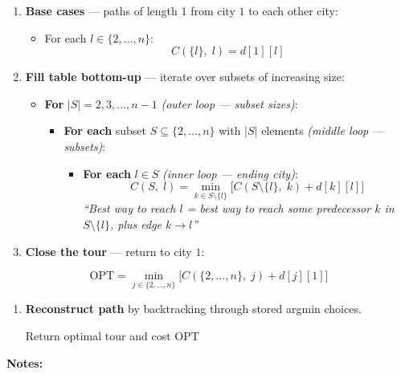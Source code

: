 \documentclass[11pt]{article}
\providecommand{\tightlist}{%
      \setlength{\itemsep}{0pt}\setlength{\parskip}{0pt}}
\begin{document}
\begin{enumerate}
\def\labelenumi{\arabic{enumi}.}
\item
  \textbf{Base cases} --- paths of length 1 from city \(1\) to each
  other city:

  \begin{itemize}
  \tightlist
  \item
    For each \(l \in \{2, \ldots, n\}\): \[C(\{l\},\; l) = d[1][l]\]
  \end{itemize}
\item
  \textbf{Fill table bottom-up} --- iterate over subsets of increasing
  size:

  \begin{itemize}
  \tightlist
  \item
    \textbf{For} \(|S| = 2, 3, \ldots, n{-}1\) \emph{(outer loop ---
    subset sizes)}:

    \begin{itemize}
    \tightlist
    \item
      \textbf{For each} subset \(S \subseteq \{2, \ldots, n\}\) with
      \(|S|\) elements \emph{(middle loop --- subsets)}:

      \begin{itemize}
      \tightlist
      \item
        \textbf{For each} \(l \in S\) \emph{(inner loop --- ending
        city)}:
        \[C(S,\; l) = \min_{k \in S \setminus \{l\}} \bigl[C(S \setminus \{l\},\; k) + d[k][l]\bigr]\]
        \emph{``Best way to reach \(l\) = best way to reach some
        predecessor \(k\) in \(S \setminus \{l\}\), plus edge
        \(k \to l\)''}
      \end{itemize}
    \end{itemize}
  \end{itemize}
\item
  \textbf{Close the tour} --- return to city \(1\):
\end{enumerate}

\[\text{OPT} = \min_{j \in \{2,\ldots,n\}} \bigl[C(\{2,\ldots,n\},\; j) + d[j][1]\bigr]\]

\begin{enumerate}
\def\labelenumi{\arabic{enumi}.}
\setcounter{enumi}{3}
\item
  \textbf{Reconstruct path} by backtracking through stored argmin
  choices.

  Return optimal tour and cost \(\text{OPT}\)
\end{enumerate}

\textbf{Notes:}
\end{document}

